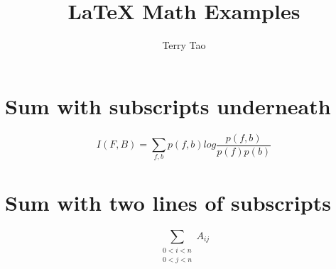 \documentclass{article}
\author{Terry Tao}
\title{\LaTeX{} Math Examples}
\begin{document}
\maketitle

\section{Sum with subscripts underneath}
\begin{equation}
  I(F,B)=\displaystyle{ \sum_{f,b} p(f,b) log \frac{p(f,b)}{p(f)p(b)} }
\end{equation}

\section{Sum with two lines of subscripts}
\begin{equation}
  \sum_{\substack{0<i<n \\ 0<j<n}} A_{ij}
\end{equation}
\end{document}
